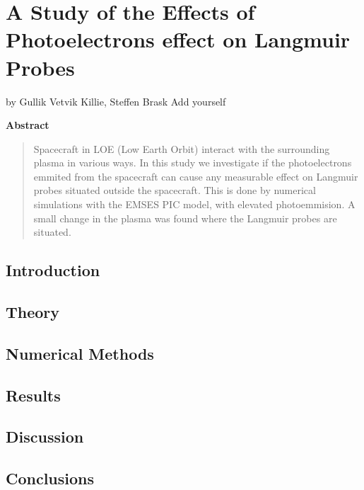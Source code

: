 \documentclass[captions=tableheading,twoside]{scrbook}
\newcommand{\agfauthor}[1]{%
	\begin{center}by #1\end{center}}
\newenvironment{Abstract}{\begin{center}\textbf{Abstract}\end{center}%
	\begin{quote}}{\end{quote}}
\begin{document}
\chapter{A Study of the Effects of Photoelectrons effect on Langmuir Probes}
\agfauthor{Gullik Vetvik Killie, Steffen Brask \large{Add yourself}}

\begin{Abstract}
	Spacecraft in LOE (Low Earth Orbit) interact with the surrounding plasma in various ways.
 	In this study we investigate if the photoelectrons emmited from the spacecraft can cause any
	measurable effect on Langmuir probes situated outside the spacecraft. This is done by numerical
 	simulations with the EMSES PIC model, with elevated photoemmision. A small change in the plasma
	was found where the Langmuir probes are situated. 
\end{Abstract}

\section{Introduction}


\section{Theory}


\section{Numerical Methods}


\section{Results}


\section{Discussion}



\section{Conclusions}



% 
\printbibliography
\end{document}
